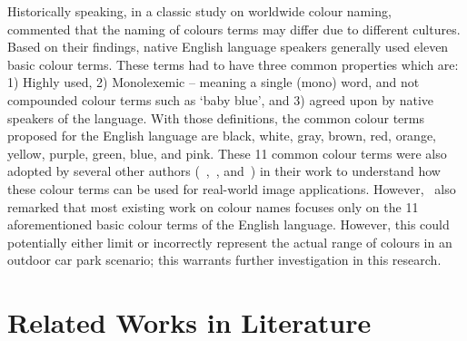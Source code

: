 Historically speaking, in a classic study on worldwide colour naming,~ commented
that the naming of colours terms may differ due to different cultures. Based on their findings, native English language speakers generally used eleven basic colour terms. These terms had to have three common properties which are: 1) Highly used, 2) Monolexemic -- meaning a single (mono) word, and not compounded colour terms such as `baby blue', and 3) agreed upon by native speakers of the language. With those definitions, the common colour terms proposed for the English language are black, white, gray, brown, red, orange, yellow, purple, green, blue, and pink. These 11 common colour terms were also adopted by
several other authors (~,~,
and~) in their work to understand how these colour
terms can be used for real-world image applications.
However,~ also remarked that most existing work on colour names focuses only on the 11 aforementioned basic colour terms of the English language.
However, this could potentially either limit or incorrectly represent the actual range of colours in an outdoor car park scenario; this warrants further investigation in this research. %


\section{Related Works in Literature}
\label{section:relatedworks}

